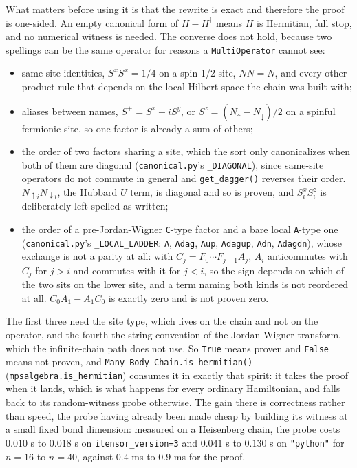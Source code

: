 \documentclass[11pt]{article}
\begin{document}
What matters before using it is that the rewrite is exact and therefore
the proof is one-sided. An empty canonical form of $H - H^\dagger$ means
$H$ is Hermitian, full stop, and no numerical witness is needed. The
converse does not hold, because two spellings can be the same operator
for reasons a \texttt{MultiOperator} cannot see:

\begin{itemize}
  \item same-site identities, $S^x S^x = 1/4$ on a spin-1/2 site,
    $N N = N$, and every other product rule that depends on the local
    Hilbert space the chain was built with;
  \item aliases between names, $S^+ = S^x + i S^y$, or
    $S^z = (N_\uparrow - N_\downarrow)/2$ on a spinful fermionic site,
    so one factor is already a sum of others;
  \item the order of two factors sharing a site, which the sort only
    canonicalizes when both of them are diagonal
    (\texttt{canonical.py}'s \texttt{\_DIAGONAL}), since same-site
    operators do not commute in general and \texttt{get\_dagger()}
    reverses their order. $N_{\uparrow i}N_{\downarrow i}$, the Hubbard
    $U$ term, is diagonal and so is proven, and $S^x_i S^z_i$ is
    deliberately left spelled as written;
  \item the order of a pre-Jordan-Wigner \texttt{C}-type factor and a
    bare local \texttt{A}-type one (\texttt{canonical.py}'s
    \texttt{\_LOCAL\_LADDER}: \texttt{A}, \texttt{Adag}, \texttt{Aup},
    \texttt{Adagup}, \texttt{Adn}, \texttt{Adagdn}), whose exchange is
    not a parity at all: with $C_j = F_0\cdots F_{j-1} A_j$, $A_i$
    anticommutes with $C_j$ for $j>i$ and commutes with it for $j<i$, so
    the sign depends on which of the two sits on the lower site, and a
    term naming both kinds is not reordered at all.
    $C_0A_1 - A_1C_0$ is exactly zero and is not proven zero.
\end{itemize}

The first three need the site type, which lives on the chain and not on
the operator, and the fourth the string convention of the Jordan-Wigner
transform, which the infinite-chain path does not use. So \texttt{True} means proven and \texttt{False} means not
proven, and \texttt{Many\_Body\_Chain.is\_hermitian()}
(\texttt{mpsalgebra.is\_hermitian}) consumes it in exactly that spirit:
it takes the proof when it lands, which is what happens for every
ordinary Hamiltonian, and falls back to its random-witness probe
otherwise. The gain there is correctness rather than speed, the probe
having already been made cheap by building its witness at a small fixed
bond dimension: measured on a Heisenberg chain, the probe costs $0.010$
s to $0.018$ s on \texttt{itensor\_version=3} and $0.041$ s to $0.130$ s
on \texttt{"python"} for $n=16$ to $n=40$, against $0.4$ ms to $0.9$ ms
for the proof.
\end{document}
